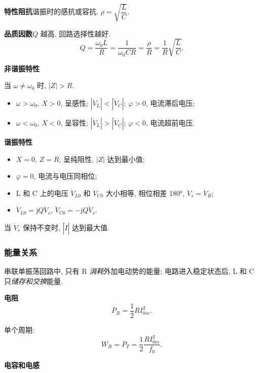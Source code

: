 \textbf{特性阻抗}\quad 谐振时的感抗或容抗. $\rho=\sqrt{\dfrac{L}{C}}$.

\textbf{品质因数}\quad $Q$ 越高, 回路选择性越好.
\begin{equation}
    Q=\frac{\omega_0L}{R}=\frac{1}{\omega_0CR}=\frac{\rho}{R}=\frac{1}{R}\sqrt{\dfrac{L}{C}}.
\end{equation}

\textbf{非谐振特性}

当 $\omega\neq\omega_0$ 时, $|Z|>R$.

\begin{itemize}
    \item $\omega>\omega_0$, $X>0$, 呈感性; $|\dot{V}_L|<|\dot{V}_C|$; $\varphi>0$, 电流滞后电压;
    \item $\omega<\omega_0$, $X<0$, 呈容性; $|\dot{V}_L|>|\dot{V}_C|$; $\varphi<0$, 电流超前电压.
\end{itemize}

\textbf{谐振特性}

\begin{itemize}
    \item $X=0$, $Z=R$, 呈纯阻性, $|Z|$ 达到最小值;
    \item $\varphi=0$, 电流与电压同相位;
    \item L 和 C 上的电压 $\dot{V}_{L0}$ 和 $\dot{V}_{C0}$ 大小相等, 相位相差 180°, $\dot{V}_s=\dot{V}_R$;
    \item $\dot{V}_{L0}=\mathrm{j}Q\dot{V}_s$, $\dot{V}_{C0}=-\mathrm{j}Q\dot{V}_s$.
\end{itemize}

当 $\dot{V}_s$ 保持不变时, $|\dot{I}|$ 达到最大值.

\subsubsection{能量关系} \label{能量关系}

串联单振荡回路中, 只有 R \textit{消耗}外加电动势的能量; 电路进入稳定状态后, L 和 C 只\textit{储存和交换}能量.

\textbf{电阻}
\begin{equation}
    \overline{P}_R=\frac{1}{2}RI_{0m}^2.
\end{equation}

单个周期:
\begin{equation}
    W_R=\overline{P}_T=\frac{1}{2}\frac{RI_{0m}^2}{f_0}.
\end{equation}

\textbf{电容和电感}

